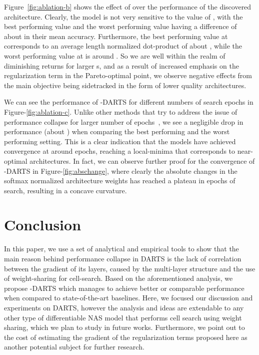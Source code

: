 \documentclass{article} \usepackage{fancyhdr, iclr2023_conference, times}
\newcommand{\mydarts}{-DARTS\xspace}
\begin{document}
\par Figure~\ref{fig:ablation-b} shows the effect of  over the performance of the discovered architecture. Clearly, the model is not very sensitive to the value of , with the best performing value and the worst performing value having a difference of about  in their mean accuracy. Furthermore, the best performing value at  corresponds to an average length normalized dot-product of about , while the worst performing value at  is around . So we are well within the realm of diminishing returns for larger s, and as a result of increased emphasis on the regularization term in the Pareto-optimal point, we observe negative effects from the main objective being sidetracked in the form of lower quality architectures.
\par We can see the performance of \mydarts for different numbers of search epochs in Figure-\ref{fig:ablation-c}. Unlike other methods that try to address the issue of performance collapse for larger number of epochs~\citep{DBLP:journals/corr/abs-1910-11831, DBLP:conf/iclr/ChuW0LWY21}, we see a negligible drop in performance (about ) when comparing the best performing and the worst performing setting. This is a clear indication that the models have achieved convergence at around  epochs, reaching a local-minima that corresponds to near-optimal architectures. In fact, we can observe further proof for the convergence of \mydarts in Figure-\ref{fig:abschange}, where clearly the absolute changes in the softmax normalized architecture weights has reached a plateau in  epochs of search, resulting in a concave curvature. 
\section{Conclusion}
\par In this paper, we use a set of analytical and empirical tools to show that the main reason behind performance collapse in DARTS is the lack of correlation between the gradient of its layers, caused by the multi-layer structure and the use of weight-sharing for cell-search. Based on the aforementioned analysis, we propose \mydarts which manages to achieve better or comparable performance when compared to state-of-the-art baselines.
Here, we focused our discussion and experiments on DARTS, however the analysis and ideas are extendable to any other type of differentiable NAS model that performs cell search using weight sharing, which we plan to study in future works. Furthermore, we point out to the cost of estimating the gradient of the regularization terms proposed here as another potential subject for further research.
\end{document}
